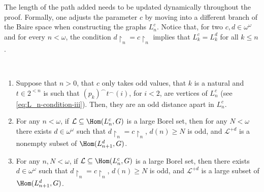 The length of the path added needs to be updated dynamically throughout the proof.
Formally, one adjusts the parameter $c$ by moving into a different branch of the Baire space when constructing the graphs $L^c_n$.
Notice that, for two $c,d\in\omega^\omega$ and for every $n<\omega$, the condition $d\restriction_n=c\restriction_n$ implies that $L^c_k=L^d_k$ for all $k\leq n$.

\begin{lemma}\label{lemma:Ln_basics}~ 
    \begin{enumerate}[label=(\alph*)]
        \item Suppose that $n>0$, that $c$ only takes odd values, that $k$ is a natural and $t\in2^{<n}$ is such that $(p_k)^\smallfrown t^\smallfrown(i)$, for $i<2$, are vertices of $L^c_n$ (see \eqref{eq:L_n-condition-iii}).
        Then, they are an odd distance apart in $L^c_n$.

        \item For any $n<\omega$, if $\mathcal L\subseteq\Hom(L^c_n,G)$ is a large Borel set, then for any $N<\omega$ there exists $d\in\omega^\omega$ such that $d\restriction_n=c\restriction_n$, $d(n)\geq N$ is odd, and $\mathcal L^{+d}$ is a nonempty subset of $\Hom(L^{d}_{n+1},G)$.

        \item For any $n,N<\omega$, if $\mathcal L\subseteq\Hom(L^c_n,G)$ is a large Borel set, then there exists $d\in\omega^\omega$ such that $d\restriction_n=c\restriction_n$, $d(n)\geq N$ is odd, and $\mathcal L^{+d}$ is a large subset of $\Hom(L^{d}_{n+1},G)$.
    \end{enumerate}
\end{lemma}

